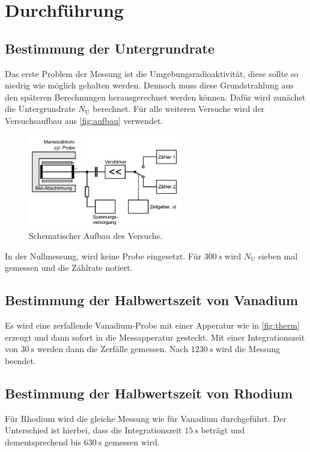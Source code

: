 \section{Durchführung}
\label{sec:Durchführung}


\subsection{Bestimmung der Untergrundrate}
\label{ssec:d1}

Das erste Problem der Messung ist die Umgebungsradioaktivität, diese sollte so niedrig wie möglich gehalten werden.
Dennoch muss diese Grundstrahlung aus den späteren Berechnungen herausgerechnet werden können. 
Dafür wird zunächst die Untergrundrate $N_\text{U}$ berechnet. 
Für alle weiteren Versuche wird der Versuchsaufbau aus \autoref{fig:aufbau} verwendet.

\begin{figure}
    \centering
    \includegraphics[width=0.6\textwidth]{images/bild3.png}
    \caption{Schematischer Aufbau des Versuchs.\cite{V702}}
    \label{fig:aufbau}
\end{figure}

In der Nullmessung, wird keine Probe eingesetzt.
Für $\SI{300}{\second}$ wird $N_\text{U}$ sieben mal gemessen und die Zählrate notiert.

\subsection{Bestimmung der Halbwertszeit von Vanadium}
\label{ssec:d2}

Es wird eine zerfallende Vanadium-Probe mit einer Apperatur wie in \autoref{fig:therm} erzeugt und dann sofort in die Messapperatur gesteckt. 
Mit einer Integrationszeit von $\SI{30}{\second}$ werden dann die Zerfälle gemessen.
Nach $\SI{1230}{\second}$ wird die Messung beendet.

\subsection{Bestimmung der Halbwertszeit von Rhodium}
\label{ssec:d3}

Für Rhodium wird die gleiche Messung wie für Vanadium durchgeführt.
Der Unterschied ist hierbei, dass die Integrationszeit $\SI{15}{\second}$ beträgt und dementsprechend bis $\SI{630}{\second}$ gemessen wird.